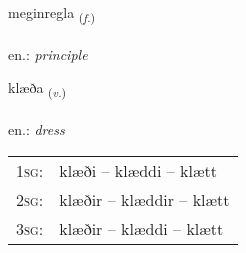 \documentclass[frontgrid, backgrid]{flacards}\usepackage[]{graphicx}\usepackage[]{xcolor}
\begin{document}
\renewcommand{\flhead}{\vskip5pt \fboxsep=0pt {\small\bfseries\footnotesize Nafnorð | Noun}}
\renewcommand{\fcfoot}{\vskip5pt \fboxsep=0pt \hspace{2pt}{\small\bfseries\footnotesize 2K}}

\renewcommand{\blhead}{\vskip5pt {\small\bfseries\footnotesize Nafnorð | Noun }}
\renewcommand{\bcfoot}{\vskip5pt \hspace{2pt}{\small\bfseries\footnotesize 2K}}


{meginregla \small{\textsubscript{(\textit{f.})}} \\[1ex] %
\textphonetic{[meijɪnrɛkla]} \\
en.: \emph{principle} \\  [2ex]
\renewcommand*{\arraystretch}{0.8}
}

\renewcommand{\flhead}{\vskip5pt \fboxsep=0pt {\small\bfseries\footnotesize Sagnorð | Verb}}
\renewcommand{\fcfoot}{\vskip5pt \fboxsep=0pt \hspace{2pt}{\small\bfseries\footnotesize 2K}}

\renewcommand{\blhead}{\vskip5pt {\small\bfseries\footnotesize Sagnorð | Verb }}
\renewcommand{\bcfoot}{\vskip5pt \hspace{2pt}{\small\bfseries\footnotesize 2K}}


{klæða \small{\textsubscript{(\textit{v.})}} \\[1ex] %
\textphonetic{[kʰlaiːða]} \\
en.: \emph{dress} \\  [2ex]
\renewcommand*{\arraystretch}{0.8}
\begin{tabular}{p{1cm}l}
\textsc{1sg}: & klæði -- klæddi -- klætt \\ 
\textsc{2sg}: & klæðir -- klæddir -- klætt \\ 
\textsc{3sg}: & klæðir -- klæddi -- klætt \\ 
\end{tabular}
}
\end{document}
